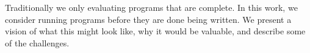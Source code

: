 Traditionally we only evaluating programs that are complete. In this work,
we consider running programs before they are done being written. We present
a vision of what this might look like, why it would be valuable, and
describe some of the challenges.
